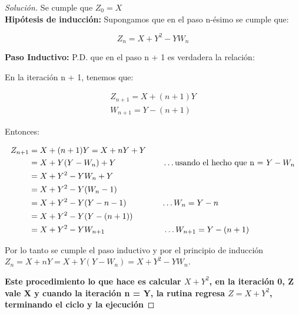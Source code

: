 \begin{proof}[Solución]
    Se cumple que $Z_0 = X$\\
    \textbf{Hipótesis de inducción:} Supongamos que en el paso n-ésimo
    se cumple que:

    \begin{equation}
      Z_n = X + Y^2-YW_n
    \end{equation}

   \textbf{Paso Inductivo:} P.D. que en el paso n + 1 es verdadera la
   relación:

   En la iteración n + 1, tenemos que:

   \begin{equation*}
     \begin{split}
       Z_{n+1} = X + (n + 1)Y\\
       W_{n+1} = Y - (n + 1)
     \end{split}
   \end{equation*}

   Entonces:

   \begin{equation*}
     \begin{split}
       Z_{n+1} & = X + (n + 1)Y = X + nY + Y \\
       & = X + Y(Y - W_n) + Y \hspace{2cm}\ldots \text{usando el hecho que n = } Y
       - W_n\\
       & = X + Y^2 - YW_n + Y\\
       & = X + Y^2 - Y(W_n - 1)\\
       & = X + Y^2 - Y(Y - n - 1) \hspace{1.5cm}\ldots W_n = Y - n\\
       & = X + Y^2 - Y(Y - (n + 1))\\
       & = X + Y^2 - YW_{n + 1} \hspace{2.5cm}\ldots W_{n+1} = Y - (n + 1)
     \end{split}
   \end{equation*}

   Por lo tanto se cumple el paso inductivo y por el principio de
   inducción $Z_n = X + nY = X + Y(Y - W_n) = X + Y^2 - YW_n$.

   \textbf{Este procedimiento lo que hace es calcular $X + Y^2$, en la
     iteración 0, Z vale X y cuando la iteración n = Y,  la rutina
     regresa $Z = X + Y^2$, terminando el ciclo y la ejecución}
  \end{proof}